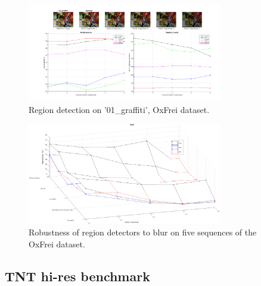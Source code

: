 \documentclass[conference,compsoc]{IEEEtran}
\begin{document}
\begin{figure}[htb]
\centering
\begin{minipage}[b]{.99\linewidth}
  \centering
 \centerline{\includegraphics[width=8.5cm]{repeatability_all_combined_01_graffiti_ligthing_good}}
\end{minipage}
\hfill
\caption{Region detection on '01\_graffiti', OxFrei dataset.}
\label{fig:det_frei}
%
\end{figure}

\begin{figure}[htb]

\begin{minipage}[b]{.9\linewidth}
  \centering
  \centerline{\includegraphics[width=8.5cm]{blur_some_combined}}
\end{minipage}
\hfill
\caption{Robustness of region detectors to blur on five sequences of the OxFrei dataset.}
\label{fig:blur}
%
\end{figure}
\subsection{TNT hi-res benchmark}
\label{ssec:tnt}
\end{document}
